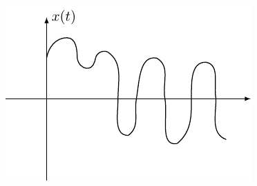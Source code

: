 \documentclass{beamer}
\begin{document}
\begin{frame}[t]
	\begin{block}{}
		\begin{figure}[hbtp!]
			\centering
			\includegraphics[width= 0.7 \linewidth]{IMAGENES/9/tikz.pdf}
		\end{figure}
	\end{block}
\end{frame}
\end{document}
